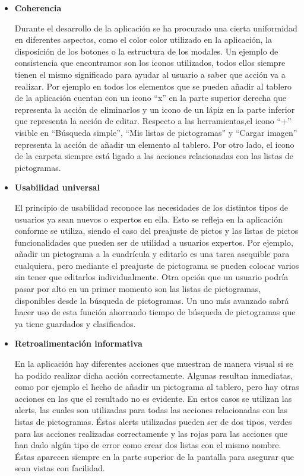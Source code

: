 \begin{itemize}
	\item \textbf{Coherencia}
	
	Durante el desarrollo de la aplicación se ha procurado una cierta uniformidad en diferentes aspectos, como el color color utilizado en la aplicación, la disposición de los botones o la estructura de los modales.  
	Un ejemplo de consistencia que encontramos son los iconos utilizados, todos ellos siempre tienen el mismo significado para ayudar al usuario a saber que acción va a realizar. Por ejemplo en todos los elementos que se pueden añadir al tablero de la aplicación cuentan con un icono “x” en la parte superior derecha que representa la acción de eliminarlos y un icono de un lápiz en la parte inferior que representa la acción de editar.
	Respecto a las herramientas,el icono “+” visible en “Búsqueda simple”,  “Mis listas de pictogramas” y  “Cargar imagen” representa la acción de añadir un elemento al tablero. Por otro lado, el icono de la carpeta siempre está ligado a las acciones relacionadas con las listas de pictogramas.
	
	\item \textbf{Usabilidad universal}
	
	El principio de usabilidad reconoce las necesidades de los distintos tipos de usuarios ya sean nuevos o expertos en ella. Esto se refleja en la aplicación conforme se utiliza, siendo el caso del preajuste de pictos y las listas de pictos funcionalidades que pueden ser de utilidad a usuarios expertos. Por ejemplo, añadir un pictograma a la cuadrícula y editarlo es una tarea asequible para cualquiera, pero mediante el preajuste de pictograma se pueden colocar varios sin tener que editarlos individualmente. 
	Otra opción que un usuario podría pasar por alto en un primer momento son las listas de pictogramas, disponibles desde la búsqueda de pictogramas. Un uno más avanzado sabrá hacer uso de esta función ahorrando tiempo de búsqueda de pictogramas que ya tiene guardados y clasificados. 
	
	\item \textbf{Retroalimentación informativa}
	
	En la aplicación hay diferentes acciones que muestran de manera visual si se ha podido realizar dicha acción correctamente. Algunas resultan inmediatas, como por ejemplo el hecho de añadir un pictograma al tablero, pero hay otras acciones en las que el resultado no es evidente. En estos casos se utilizan las alerts, las cuales son utilizadas para todas las acciones relacionadas con las listas de pictogramas. Éstas alerts utilizadas pueden ser de dos tipos, verdes para las acciones realizadas correctamente y las rojas para las acciones que han dado algún tipo de error como crear dos listas con el mismo nombre. Éstas aparecen siempre en la parte superior de la pantalla para asegurar que sean vistas con facilidad.
	

\end{itemize}
